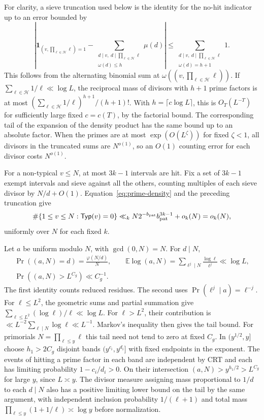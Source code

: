 \documentclass[11pt]{amsart}
\numberwithin{equation}{section}
\theoremstyle{remark}
\newcommand{\E}{\mathbb E}
\newcommand{\one}{\mathbf 1}
\newcommand{\Typ}{\mathsf{Typ}}
\begin{document}
For clarity, a sieve truncation used below is the identity for the no-hit indicator up to an error bounded by
\begin{equation}\label{eq:bonf}
 \left|\one_{(v,\prod_{\ell\in\mathcal H}\ell)=1}
 -\sum_{\substack{d\mid v,\ d\mid\prod_{\ell\in\mathcal H}\ell\\\omega(d)\le h}}\mu(d)\right|
 \le \sum_{\substack{d\mid v,\ d\mid\prod_{\ell\in\mathcal H}\ell\\\omega(d)=h+1}}1 .
\end{equation}
This follows from the alternating binomial sum at $\omega((v,\prod_{\ell\in\mathcal H}\ell))$. If $\sum_{\ell\in\mathcal H}1/\ell\ll\log L$, the reciprocal mass of divisors with $h+1$ prime factors is at most $(\sum_{\ell\in\mathcal H}1/\ell)^{h+1}/(h+1)!$. With $h=\lceil c\log L\rceil$, this is $O_T(L^{-T})$ for sufficiently large fixed $c=c(T)$, by the factorial bound. The corresponding tail of the expansion of the density product has the same bound up to an absolute factor. When the primes are at most $\exp(O(L^\zeta))$ for fixed $\zeta<1$, all divisors in the truncated sums are $N^{o(1)}$, so an $O(1)$ counting error for each divisor costs $N^{o(1)}$.

For a non-typical $v\le N$, at most $3k-1$ intervals are hit. Fix a set of $3k-1$ exempt intervals and sieve against all the others, counting multiples of each sieve divisor by $N/d+O(1)$. Equation~\eqref{eq:prime-density} and the preceding truncation give
\begin{equation}\label{eq:atyp}
 \#\{1\le v\le N:\Typ(v)=0\}
 \ll_k N 2^{-b_{\rm pat}}b_{\rm pat}^{3k-1}+o_k(N)=o_k(N),
\end{equation}
uniformly over $N$ for each fixed $k$.

Let $a$ be uniform modulo $N$, with $\gcd(0,N)=N$. For $d\mid N$,
\begin{equation}\label{eq:gcd-markov}
 \begin{gathered}
 \Pr((a,N)=d)=\frac{\varphi(N/d)}{N},\qquad
 \E\log(a,N)=\sum_{\ell^j\mid N}\frac{\log\ell}{\ell^j}\ll\log L,\\
 \Pr((a,N)>L^{C_g})\ll C_g^{-1}.
 \end{gathered}
\end{equation}
The first identity counts reduced residues. The second uses $\Pr(\ell^j\mid a)=\ell^{-j}$. For $\ell\le L^2$, the geometric sums and partial summation give $\sum_{\ell\le L^2}(\log\ell)/\ell\ll\log L$. For $\ell>L^2$, their contribution is $\ll L^{-2}\sum_{\ell\mid N}\log\ell\ll L^{-1}$. Markov's inequality then gives the tail bound. For primorials $N=\prod_{\ell\le y}\ell$ this tail need not tend to zero at fixed $C_g$. In $(y^{1/2},y]$ choose $h_1>2C_g$ disjoint bands $(y^{c_i},y^{d_i}]$ with fixed endpoints in the exponent. The events of hitting a prime factor in each band are independent by CRT and each has limiting probability $1-c_i/d_i>0$. On their intersection $(a,N)>y^{h_1/2}>L^{C_g}$ for large $y$, since $L\asymp y$. The divisor measure assigning mass proportional to $1/d$ to each $d\mid N$ also has a positive limiting lower bound on the tail by the same argument, with independent inclusion probability $1/(\ell+1)$ and total mass $\prod_{\ell\le y}(1+1/\ell)\asymp\log y$ before normalization.
\end{document}
